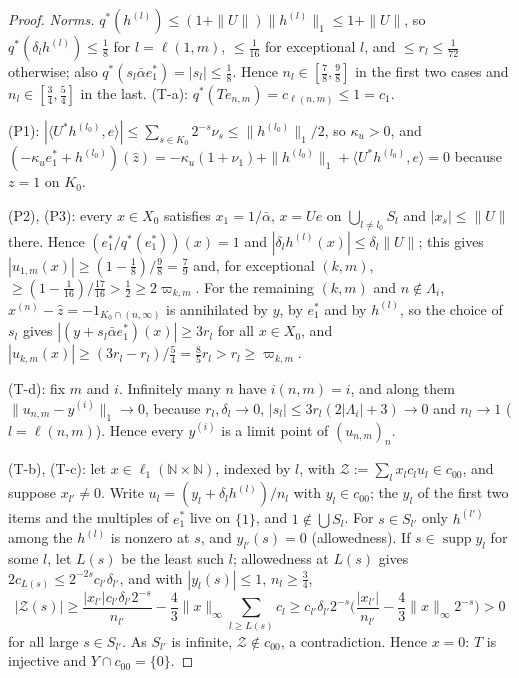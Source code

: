 \documentclass[10pt]{amsart}
\theoremstyle{definition}
\theoremstyle{remark}
\newcommand{\supp}{\operatorname{supp}}
\newcommand{\N}{\mathbb N}
\newcommand{\zh}{\hat z}
\newcommand{\ip}[2]{\langle #1,#2\rangle}
\begin{document}
\begin{proof}
\emph{Norms.}  $q^*(h^{(l)})\le(1+\|U\|)\|h^{(l)}\|_1\le1+\|U\|$, so
$q^*(\delta_lh^{(l)})\le\frac18$ for $l=\ell(1,m)$, $\le\frac1{16}$ for exceptional
$l$, and $\le r_l\le\frac1{72}$ otherwise; also $q^*(s_l\bar\alpha e_1^*)=
|s_l|\le\frac18$.  Hence $n_l\in[\frac78,\frac98]$ in the first two cases and
$n_l\in[\frac34,\frac54]$ in the last.  (T-a): $q^*(Te_{n,m})=c_{\ell(n,m)}\le1
=c_1$.

(P1): $|\ip{U^*h^{(l_0)}}{e}|\le\sum_{s\in K_0}2^{-s}\nu_s\le\|h^{(l_0)}\|_1/2$, so
$\kappa_u>0$, and $(-\kappa_u e_1^*+h^{(l_0)})(\zh)=-\kappa_u(1+\nu_1)+\|h^{(l_0)}\|_1+
\ip{U^*h^{(l_0)}}{e}=0$ because $z=1$ on $K_0$.

(P2), (P3): every $x\in X_0$ satisfies $x_1=1/\bar\alpha$, $x=Ue$ on
$\bigcup_{l\ne l_0}S_l$ and $|x_s|\le\|U\|$ there.  Hence
$(e_1^*/q^*(e_1^*))(x)=1$ and $|\delta_lh^{(l)}(x)|\le\delta_l\|U\|$; this gives
$|u_{1,m}(x)|\ge(1-\frac18)/\frac98=\frac79$ and, for exceptional $(k,m)$,
$\ge(1-\frac1{16})/\frac{17}{16}>\frac12\ge2\varpi_{k,m}$.  For the remaining
$(k,m)$ and $n\notin\Lambda_i$, $x^{(n)}-\zh=-1_{K_0\cap(n,\infty)}$ is
annihilated by $y$, by $e_1^*$ and by $h^{(l)}$, so the choice of $s_l$ gives
$|(y+s_l\bar\alpha e_1^*)(x)|\ge3r_l$ for all $x\in X_0$, and
$|u_{k,m}(x)|\ge(3r_l-r_l)/\frac54=\frac85r_l>r_l\ge\varpi_{k,m}$.

(T-d): fix $m$ and $i$.  Infinitely many $n$ have $i(n,m)=i$, and along
them $\|u_{n,m}-y^{(i)}\|_1\to0$, because $r_l,\delta_l\to0$,
$|s_l|\le3r_l(2|\Lambda_i|+3)\to0$ and $n_l\to1$ ($l=\ell(n,m)$).  Hence
every $y^{(i)}$ is a limit point of $(u_{n,m})_n$.

(T-b), (T-c): let $x\in\ell_1(\N\times\N)$, indexed by $l$, with
$\mathcal Z:=\sum_lx_lc_lu_l\in c_{00}$, and suppose $x_{l'}\ne0$.  Write
$u_l=(y_l+\delta_lh^{(l)})/n_l$ with $y_l\in c_{00}$; the $y_l$ of the first
two items and the multiples of $e_1^*$ live on $\{1\}$, and
$1\notin\bigcup S_l$.  For $s\in S_{l'}$ only $h^{(l')}$ among the $h^{(l)}$ is
nonzero at $s$, and $y_{l'}(s)=0$ (allowedness).  If $s\in\supp y_l$ for
some $l$, let $L(s)$ be the least such $l$; allowedness at $L(s)$ gives
$2c_{L(s)}\le2^{-2s}c_{l'}\delta_{l'}$, and with $|y_l(s)|\le1$,
$n_l\ge\frac34$,
\[
 |\mathcal Z(s)|\ge\frac{|x_{l'}|c_{l'}\delta_{l'}2^{-s}}{n_{l'}}-\frac43
 \|x\|_\infty\sum_{l\ge L(s)}c_l\ge c_{l'}\delta_{l'}2^{-s}
 \Big(\frac{|x_{l'}|}{n_{l'}}-\frac43\|x\|_\infty2^{-s}\Big)>0
\]
for all large $s\in S_{l'}$.  As $S_{l'}$ is infinite, $\mathcal Z\notin c_{00}$,
a contradiction.  Hence $x=0$: $T$ is injective and $Y\cap c_{00}=\{0\}$.
\end{proof}
\end{document}
